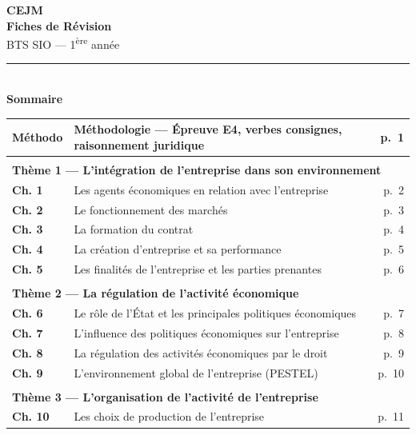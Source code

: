\documentclass[a4paper]{article}
\begin{document}
\begin{center}
  \vspace*{2cm}
  {\fontsize{32}{40}\selectfont\bfseries\color[RGB]{80,0,140} CEJM}\\[8pt]
  {\fontsize{18}{24}\selectfont\bfseries\color[RGB]{50,50,50} Fiches de Révision}\\[4pt]
  {\fontsize{14}{18}\selectfont\color[RGB]{80,0,140} BTS SIO — 1\textsuperscript{ère} année}\\[60pt]

  \noindent\rule{\linewidth}{1pt}\\[12pt]

  {\large\bfseries Sommaire}\\[12pt]

  \begin{tabular}{lp{10cm}r}
    \textbf{Méthodo} & Méthodologie — Épreuve E4, verbes consignes, raisonnement juridique & p.~1 \\[4pt]
    \hline\\[-6pt]
    \multicolumn{3}{l}{\textcolor[RGB]{0,80,160}{\textbf{Thème 1 — L'intégration de l'entreprise dans son environnement}}} \\[4pt]
    \textbf{Ch. 1}  & Les agents économiques en relation avec l'entreprise & p.~2 \\
    \textbf{Ch. 2}  & Le fonctionnement des marchés                        & p.~3 \\
    \textbf{Ch. 3}  & La formation du contrat                               & p.~4 \\
    \textbf{Ch. 4}  & La création d'entreprise et sa performance            & p.~5 \\
    \textbf{Ch. 5}  & Les finalités de l'entreprise et les parties prenantes & p.~6 \\[4pt]
    \hline\\[-6pt]
    \multicolumn{3}{l}{\textcolor[RGB]{0,80,160}{\textbf{Thème 2 — La régulation de l'activité économique}}} \\[4pt]
    \textbf{Ch. 6}  & Le rôle de l'État et les principales politiques économiques & p.~7 \\
    \textbf{Ch. 7}  & L'influence des politiques économiques sur l'entreprise     & p.~8 \\
    \textbf{Ch. 8}  & La régulation des activités économiques par le droit        & p.~9 \\
    \textbf{Ch. 9}  & L'environnement global de l'entreprise (PESTEL)             & p.~10 \\[4pt]
    \hline\\[-6pt]
    \multicolumn{3}{l}{\textcolor[RGB]{0,80,160}{\textbf{Thème 3 — L'organisation de l'activité de l'entreprise}}} \\[4pt]
    \textbf{Ch. 10} & Les choix de production de l'entreprise                     & p.~11 \\
  \end{tabular}


\end{center}
\end{document}
